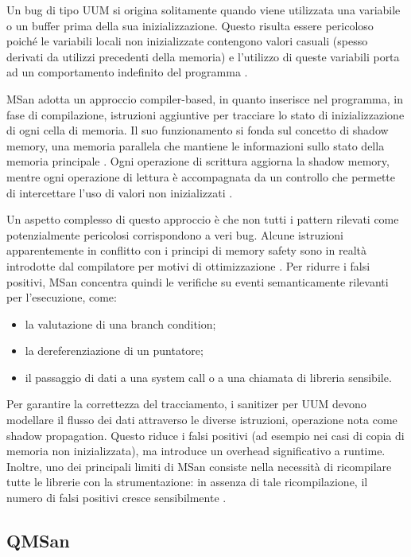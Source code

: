 Un bug di tipo UUM si origina solitamente quando viene utilizzata una variabile o un buffer prima della sua inizializzazione. Questo risulta essere  pericoloso poiché le variabili locali non inizializzate contengono valori casuali (spesso derivati da utilizzi precedenti della memoria) e l’utilizzo di queste variabili porta ad un comportamento indefinito del programma \cite{ref9}.

MSan adotta un approccio compiler-based, in quanto inserisce nel programma, in fase di compilazione, istruzioni aggiuntive per tracciare lo stato di inizializzazione di ogni cella di memoria. Il suo funzionamento si fonda sul concetto di shadow memory, una memoria parallela che mantiene le informazioni sullo stato della memoria principale \cite{ref8}. Ogni operazione di scrittura aggiorna la shadow memory, mentre ogni operazione di lettura è accompagnata da un controllo che permette di intercettare l’uso di valori non inizializzati \cite{ref3}.

Un aspetto complesso di questo approccio è che non tutti i pattern rilevati come potenzialmente pericolosi corrispondono a veri bug. Alcune istruzioni apparentemente in conflitto con i principi di memory safety sono in realtà introdotte dal compilatore per motivi di ottimizzazione \cite{12}. Per ridurre i falsi positivi, MSan concentra quindi le verifiche su eventi semanticamente rilevanti per l’esecuzione, come:
\begin{itemize}
    \item la valutazione di una branch condition;
    \item la dereferenziazione di un puntatore;
    \item il passaggio di dati a una system call o a una chiamata di libreria sensibile.
\end{itemize}

Per garantire la correttezza del tracciamento, i sanitizer per UUM devono modellare il flusso dei dati attraverso le diverse istruzioni, operazione nota come shadow propagation. Questo riduce i falsi positivi (ad esempio nei casi di copia di memoria non inizializzata), ma introduce un overhead significativo a runtime. Inoltre, uno dei principali limiti di MSan consiste nella necessità di ricompilare tutte le librerie con la strumentazione: in assenza di tale ricompilazione, il numero di falsi positivi cresce sensibilmente \cite{ref12}.

\subsection{QMSan}

